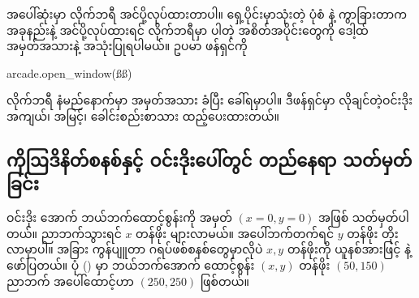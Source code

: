 \begin{figure}[tb!]
\caption{}
\label{fig:ch07starter}
\end{figure}

အပေါ်ဆုံးမှာ  လိုက်ဘရီ အင်ပို့လုပ်ထားတာပါ။ ရှေ့ပိုင်းမှာသုံးတဲ့    ပုံစံ နဲ့ ကွာခြားတာက အခုနည်းနဲ့ အင်ပို့လုပ်ထားရင် လိုက်ဘရီမှာ ပါတဲ့ အစိတ်အပိုင်းတွေကို ဒေါ့ထ်အမှတ်အသားနဲ့ အသုံးပြုရပါမယ်။ ဥပမာ  ဖန်ရှင်ကို
\begin{codetxt}
arcade.open_window(ßß)
\end{codetxt} 
လိုက်ဘရီ နံမည်နောက်မှာ \fEn{(}\fEn{)} အမှတ်အသား ခံပြီး ခေါ်ရမှာပါ။ ဒီဖန်ရှင်မှာ လိုချင်တဲ့ဝင်းဒိုး အကျယ်၊ အမြင့်၊ ခေါင်းစည်းစာသား ထည့်ပေးထားတယ်။ 

\subsection*{ကိုဩဒိနိတ်စနစ်နှင့် ဝင်းဒိုးပေါ်တွင် တည်နေရာ သတ်မှတ်ခြင်း}
ဝင်းဒိုး အောက် ဘယ်ဘက်ထောင့်စွန်းကို  အမှတ် $(x=0, y=0)$ အဖြစ် သတ်မှတ်ပါတယ်။  ညာဘက်သွားရင် $x$ တန်ဖိုး များလာမယ်။ အပေါ်ဘက်တက်ရင် $y$ တန်ဖိုး တိုးလာမှာပါ။ အခြား ကွန်ပျူတာ ဂရပ်ဖစ်စနစ်တွေမှာလိုပဲ $x, y$ တန်ဖိုးကို ယူနစ်အားဖြင့်  နဲ့ ဖော်ပြတယ်။ ပုံ (\fRefNo{\ref{fig:arcadeCoord}}) မှာ  ဘယ်ဘက်အောက် ထောင့်စွန်း $(x,y)$ တန်ဖိုး $(50,150)$\fEn{,} ညာဘက် အပေါ်ထောင့်ဟာ $(250,250)$ ဖြစ်တယ်။

\begin{figure}[tbh!]
\caption{} 
\label{fig:arcadeCoord}
\end{figure}



